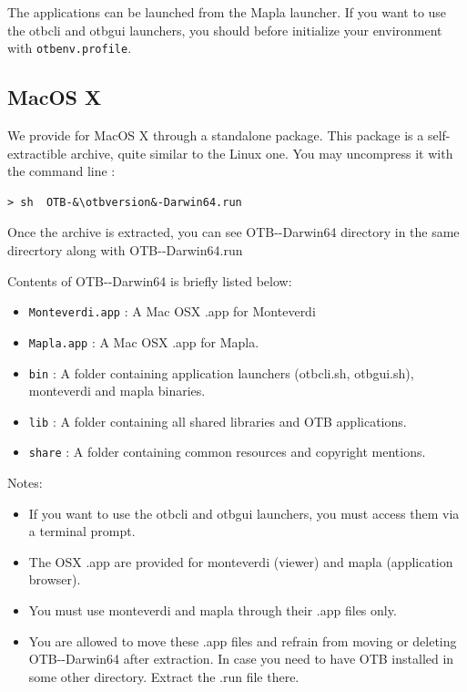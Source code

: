 The applications can be launched from the Mapla launcher. If you want to use
the otbcli and otbgui launchers, you should before initialize your environment
with \verb?otbenv.profile?.

\subsection{MacOS X}

We provide \app for MacOS X through a standalone package. This package is a
self-extractible archive, quite similar to the Linux one. You may uncompress
it with the command line :


\begin{lstlisting}[frame=none,numbers=none]
> sh  OTB-&\otbversion&-Darwin64.run
\end{lstlisting}

Once the archive is extracted,  you can see OTB-\otbversion-Darwin64 directory in the same direcrtory along with OTB-\otbversion-Darwin64.run

Contents of OTB-\otbversion-Darwin64 is briefly listed below:
\begin{itemize}
\item \verb?Monteverdi.app? : A Mac OSX .app for Monteverdi
\item \verb?Mapla.app? : A Mac OSX .app for Mapla.
\item \verb?bin? : A folder containing application launchers (otbcli\textunderscore *.sh,
otbgui\textunderscore *.sh), monteverdi and mapla binaries.
\item \verb?lib?  : A folder containing all shared libraries and OTB applications.
\item \verb?share? : A folder containing common resources and copyright mentions.
\end{itemize}

Notes:
\begin{itemize}
\item If you want to use the otbcli and otbgui launchers, you must access them via a terminal prompt.
\item The OSX .app are provided for monteverdi (viewer) and mapla (application browser).
\item You must use monteverdi and mapla through their .app files only.
\item You are allowed to move these .app files and refrain from moving or deleting OTB-\otbversion-Darwin64 after extraction.
In case you need to have OTB installed in some other directory. Extract the .run file there.
\end{itemize}

